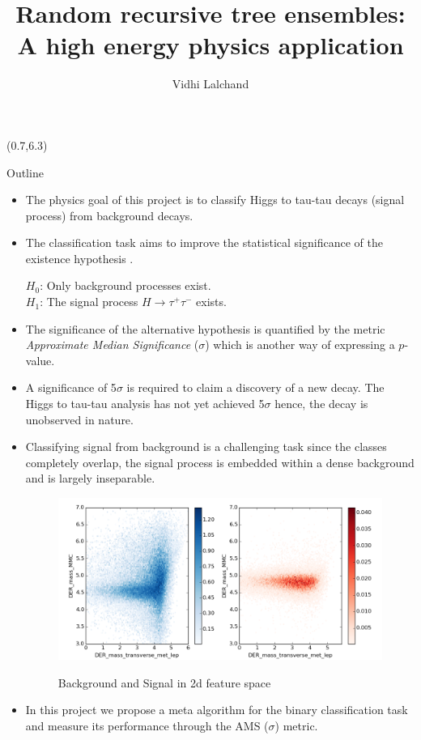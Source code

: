 \documentclass[final]{beamer}
\title{{Random recursive tree ensembles: A high energy physics application}}
\author{\small{Vidhi Lalchand}}
\begin{document}
\begin{frame}{} 

\begin{textblock}{20.0}(0.7,6.3)

\begin{block}{Outline}
\begin{itemize}
\item {The physics goal of this project is to classify Higgs to tau-tau decays (signal process) from background decays.} 
\item The classification task aims to improve the statistical significance of the existence hypothesis \cite{rm}. 
\begin{center}
$H_{0}$: Only background processes exist. \\ \hspace*{6mm}
$H_{1}$: The signal process $H \rightarrow \tau^{+}\tau^{-}$ exists.
\end{center}
\item The significance of the alternative hypothesis is quantified by the metric \textit{Approximate Median Significance} ($\sigma$) which is another way of expressing a $p$-value.
\item A significance of 5$\sigma$ is required to claim a discovery of a new decay. The Higgs to tau-tau analysis has not yet achieved 5$\sigma$ hence, the decay is unobserved in nature. 
\item Classifying signal from background is a challenging task since the classes completely overlap, the signal process is embedded within a dense background and is largely inseparable. 
\begin{figure}
\includegraphics[scale=0.6]{scatter1.png}\\
\caption{\tiny{Background and Signal in 2d feature space}}
\end{figure}
\item In this project we propose a meta algorithm for the binary classification task and measure its performance through the AMS ($\sigma$) metric. 

\end{itemize}
\end{block}
\end{textblock}
\end{frame}
\end{document}
